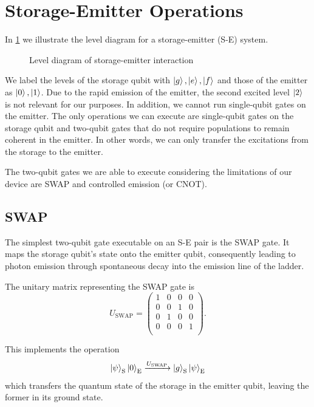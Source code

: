 \section{Storage-Emitter Operations}
\label{sec:S-E}

In \cref{fig:level_S-E} we illustrate the level diagram for a storage-emitter (S-E) system.
\begin{figure}[h]
    \centering
    
    \vspace{-1cm}
    \caption{Level diagram of storage-emitter interaction}
    \label{fig:level_S-E}
\end{figure}

We label the levels of the storage qubit with $\ket{g}, \ket{e}, \ket{f}$ and those of the emitter as $\ket{0}, \ket{1}$.
Due to the rapid emission of the emitter, the second excited level $\ket{2}$ is not relevant for our purposes.
In addition, we cannot run single-qubit gates on the emitter.
The only operations we can execute are single-qubit gates on the storage qubit and two-qubit gates that do not require populations to remain coherent in the emitter.
In other words, we can only transfer the excitations from the storage to the emitter.

The two-qubit gates we are able to execute considering the limitations of our device are SWAP and controlled emission (or CNOT).

\subsection{SWAP}


The simplest two-qubit gate executable on an S-E pair is the SWAP gate. 
It maps the storage qubit's state onto the emitter qubit, consequently leading to photon emission through spontaneous decay into the emission line of the ladder.

The unitary matrix representing the SWAP gate is
\begin{equation}
    U_{\text{SWAP}} = 
    \begin{pmatrix}
    1 & 0 & 0 & 0 \\
    0 & 0 & 1 & 0 \\
    0 & 1 & 0 & 0 \\
    0 & 0 & 0 & 1 \\
\end{pmatrix}.
\end{equation}

This implements the operation
\begin{equation}
    \ket{\psi}_{\text{S}} \ket{0}_{\text{E}} \xrightarrow{U_{\text{SWAP}}}
    \ket{g}_{\text{S}} \ket{\psi}_{\text{E}}
\end{equation}
which transfers the quantum state of the storage in the emitter qubit, leaving the former in its ground state.

